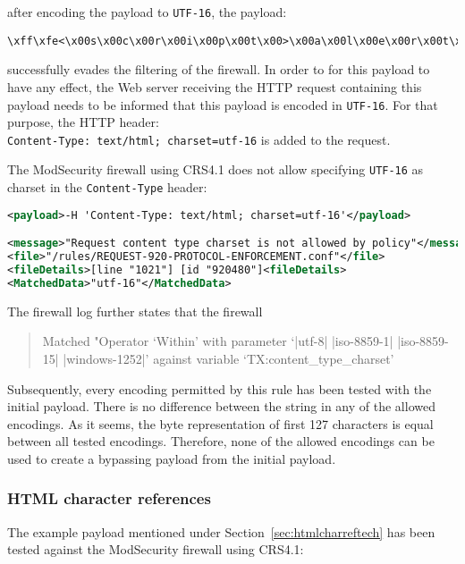 after encoding the payload to \verb|UTF-16|, the payload:

\begin{lstlisting}[style=basicStyle]
\xff\xfe<\x00s\x00c\x00r\x00i\x00p\x00t\x00>\x00a\x00l\x00e\x00r\x00t\x00(\x00'\x00x\x00s\x00s\x00'\x00)\x00<\x00/\x00s\x00c\x00r\x00i\x00p\x00t\x00>\x00
\end{lstlisting}

successfully evades the filtering of the firewall. In order to for this payload to have any effect, the Web server receiving the HTTP request containing this payload needs to be informed that this payload is encoded in \verb|UTF-16|. For that purpose, the HTTP header: \\
\verb|Content-Type: text/html; charset=utf-16| is added to the request.

The ModSecurity firewall using CRS4.1 does not allow specifying \verb|UTF-16| as charset in the \verb|Content-Type| header:

\begin{lstlisting}[style=ruleStyle, language=XML, caption=utf-16 charset header blocked, label={lst:utf16charsetheaderblocked}]
<payload>-H 'Content-Type: text/html; charset=utf-16'</payload>

<message>"Request content type charset is not allowed by policy"</message>
<file>"/rules/REQUEST-920-PROTOCOL-ENFORCEMENT.conf"</file>
<fileDetails>[line "1021"] [id "920480"]<fileDetails>
<MatchedData>"utf-16"</MatchedData>
\end{lstlisting}

The firewall log further states that the firewall 

\begin{quote}
	Matched "Operator `Within' with parameter `|utf-8| |iso-8859-1| |iso-8859-15| |windows-1252|' against variable `TX:content\_type\_charset'
\end{quote}

Subsequently, every encoding permitted by this rule has been tested with the initial payload. There is no difference between the string in any of the allowed encodings. As it seems, the byte representation of first 127 characters is equal between all tested encodings. \cite{enc/diffa, enc/diffb, enc/diffc} Therefore, none of the allowed encodings can be used to create a bypassing payload from the initial payload. 


\subsubsection{HTML character references}
\label{sec:htmlcharrefsingleeva}
The example payload mentioned under Section~\ref{sec:htmlcharreftech} has been tested against the ModSecurity firewall using CRS4.1:

